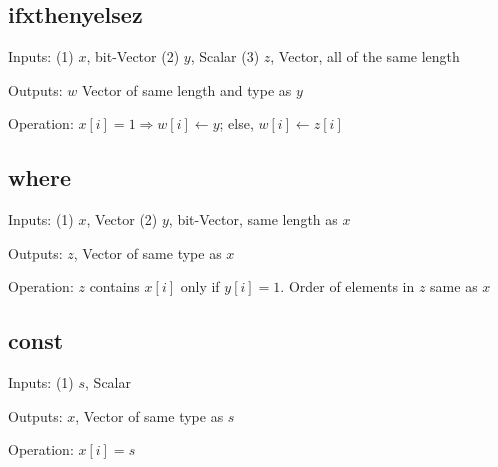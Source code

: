\subsection{ifxthenyelsez}
\label{ifxthenyelsez}
\bi
\item Inputs: (1) \(x\), bit-Vector (2) \(y\), Scalar (3) \(z\), Vector, all of
the same length

\item Outputs: \(w\) Vector of same length and type as \(y\)

\item Operation: \(x[i] = 1 \Rightarrow w[i] \leftarrow y\); else, \(w[i]
\leftarrow z[i]\)

\ei


\subsection{where}
\label{where}
\bi
\item Inputs: (1) \(x\), Vector  (2) \(y\), bit-Vector, same length as \(x\)

\item Outputs: \(z\), Vector of same type as \(x\)

\item Operation: \(z\) contains \(x[i]\) only if
\(y[i] = 1\). Order of elements in  \(z\) same as \(x\)

\ei

\subsection{const}
\label{const}
\bi
\item Inputs: (1) \(s\), Scalar 

\item Outputs: \(x\), Vector of same type as \(s\)

\item Operation: \(x[i] = s\)

\ei

